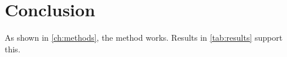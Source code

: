 \documentclass{report}
\begin{document}





\chapter{Conclusion}
\label{ch:conclusion}

As shown in \cref{ch:methods}, the method works.
Results in \cref{tab:results} support this.
\end{document}
